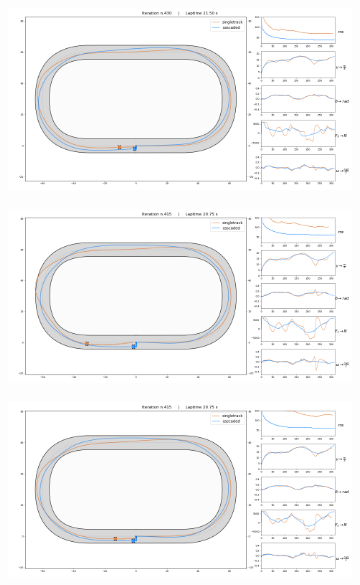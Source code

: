 \documentclass[a4paper, onecolumn, 11pt]{article}
\begin{document}
\begin{figure}[H]
    \captionsetup[subfigure]{justification=centering}
    \centering
    \begin{subfigure}{0.8\textwidth}
        \centering
        \includegraphics[width=\textwidth]{assets/im/race1.png}
        \label{race1}
    \end{subfigure}
    \begin{subfigure}{0.8\textwidth}
        \centering
        \includegraphics[width=\textwidth]{assets/im/race7.png}
        \label{race7}
    \end{subfigure}
    \begin{subfigure}{0.8\textwidth}
        \centering
        \includegraphics[width=\textwidth]{assets/im/race5.png}

\end{subfigure}
\end{figure}
\end{document}
